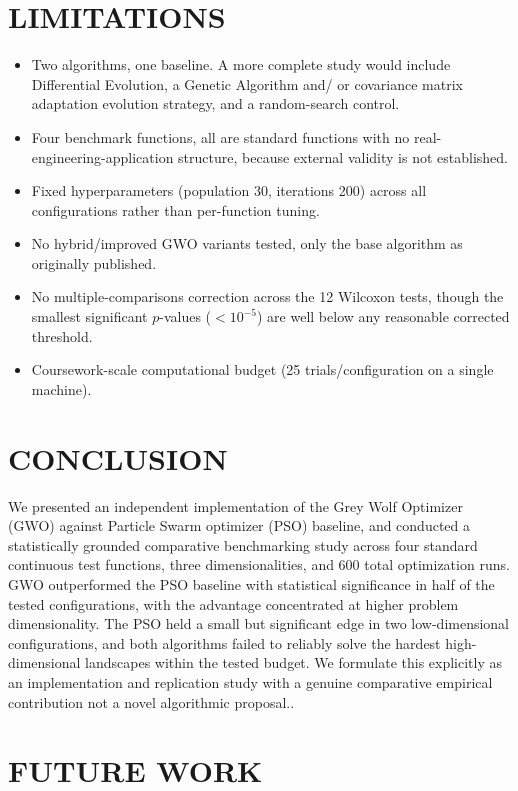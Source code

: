 \documentclass[journal]{IEEEtran}
\begin{document}
\section{LIMITATIONS}

\begin{itemize}
  \item Two algorithms, one baseline. A more complete study would include Differential Evolution, a Genetic Algorithm and/ or covariance matrix adaptation evolution strategy, and a random-search control.
  \item Four benchmark functions, all are standard functions with no real-engineering-application structure, because external validity is not established.
  \item Fixed hyperparameters (population 30, iterations 200) across all configurations rather than per-function tuning.
  \item No hybrid/improved GWO variants tested, only the base algorithm as originally published.
  \item No multiple-comparisons correction across the 12 Wilcoxon tests, though the smallest significant $p$-values ($<10^{-5}$) are well below any reasonable corrected threshold.
  \item Coursework-scale computational budget (25 trials/configuration on a single machine).
\end{itemize}


\section{CONCLUSION}

We presented an independent implementation of the Grey Wolf Optimizer (GWO) against Particle Swarm optimizer (PSO) baseline, and conducted a statistically grounded comparative benchmarking study across four standard continuous test functions, three dimensionalities, and 600 total optimization runs. GWO outperformed the PSO baseline with statistical significance in half of the tested configurations, with the advantage concentrated at higher problem dimensionality. The PSO held a small but significant edge in two low-dimensional configurations, and both algorithms failed to reliably solve the hardest high-dimensional landscapes within the tested budget. We formulate this explicitly as an implementation and replication study with a genuine comparative empirical contribution not a novel algorithmic proposal..

\section{FUTURE WORK}
\end{document}
